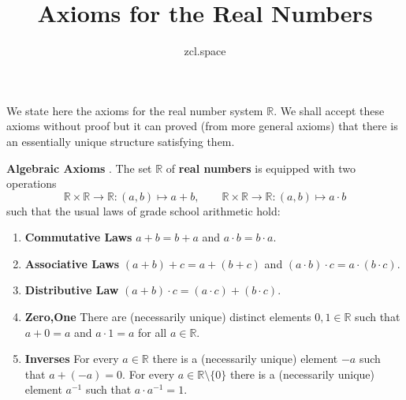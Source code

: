 \documentclass[10pt,a4paper,UTF8]{article}
\author{zcl.space}
\date{}
\title{Axioms for the Real Numbers}
\begin{document}
\maketitle
\tableofcontents
{}
We state here the axioms for the real number system \(\mathbb{R}\).
We shall accept these axioms without proof but
it can proved (from more general axioms)
that there is an essentially unique structure satisfying them.


\textbf{Algebraic Axioms} .
The set \(\mathbb{R}\) of \textbf{real numbers}  is equipped with two operations
$$
\mathbb{R}\times\mathbb{R}\to\mathbb{R}:(a,b)\mapsto a+b,\qquad\mathbb{R}\times\mathbb{R}\to\mathbb{R}:(a,b)\mapsto a\cdot b
$$
such that the usual laws of grade school arithmetic hold:

\begin{enumerate}
\item \textbf{Commutative Laws} \(a+b=b+a\) and \(a\cdot b=b\cdot a\).
\item \textbf{Associative Laws}  \((a+b)+c=a+(b+c)\) and \((a\cdot b)\cdot c= a\cdot (b\cdot c)\).
\item \textbf{Distributive Law} \((a+b)\cdot c= (a\cdot c)+(b\cdot c)\).
\item \textbf{Zero,One} There are (necessarily unique) distinct elements \(0,1\in\mathbb{R}\) such that \(a+0=a\) and \(a\cdot 1=a\) for all \(a\in\mathbb{R}\).
\item \textbf{Inverses} For every \(a\in\mathbb{R}\) there is a (necessarily unique) element \(-a\) such that \(a+(-a)=0\). For every \(a\in\mathbb{R}\setminus\{0\}\) there is a (necessarily unique) element \(a^{-1}\) such that \(a\cdot a^{-1}=1\).
\end{enumerate}
\end{document}
